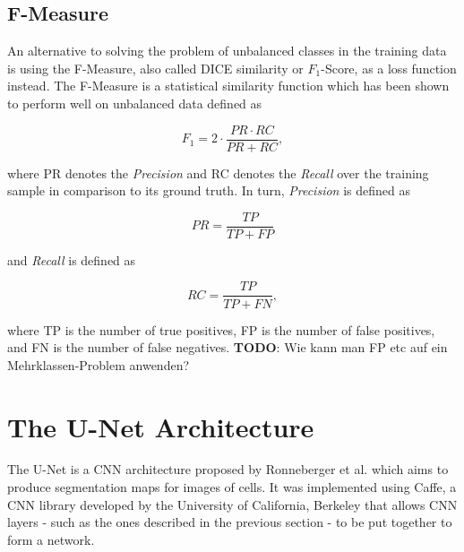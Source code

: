 		\subsection{F-Measure}

An alternative to solving the problem of unbalanced classes in the training data is using the F-Measure, also called DICE similarity or $F_1$-Score, as a loss function instead. The F-Measure is a statistical similarity function which has been shown to perform well on unbalanced data\cite{fmeasure1}\cite{fmeasure2}\cite{fmeasure3} defined as

\[F_1 = 2 \cdot \frac{PR \cdot RC}{PR + RC},\]

\noindent where PR denotes the \textit{Precision} and RC denotes the \textit{Recall} over the training sample in comparison to its ground truth. In turn, \textit{Precision} is defined as

\[PR = \frac{TP}{TP + FP}\]

\noindent and \textit{Recall} is defined as

\[RC = \frac{TP}{TP + FN},\]

\noindent where TP is the number of true positives, FP is the number of false positives, and FN is the number of false negatives. \textbf{TODO}: Wie kann man FP etc auf ein Mehrklassen-Problem anwenden?

	\section {The U-Net Architecture}
The U-Net is a CNN architecture proposed by Ronneberger et al.\cite{unet} which aims to produce segmentation maps for images of cells. It was implemented using Caffe\cite{caffe}, a CNN library developed by the University of California, Berkeley that allows CNN layers - such as the ones described in the previous section - to be put together to form a network.

